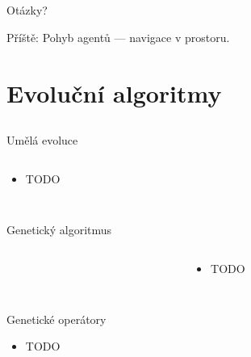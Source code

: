 \documentclass{beamer}
\begin{document}
\subsection{}
\begin{frame}{Otázky?}
\begin{center}
Příště: Pohyb agentů --- navigace v prostoru.
\end{center}
\end{frame}

\section{Evoluční algoritmy}

\subsection{}
\begin{frame}{Umělá evoluce}
\begin{columns}
\begin{column}{6cm}
\begin{itemize}
\item TODO
\end{itemize}
\end{column}
\begin{column}{5cm}
\end{column}
\end{columns}
\end{frame}

\subsection{}
\begin{frame}{Genetický algoritmus}
\begin{columns}
\begin{column}{5cm}
\end{column}
\begin{column}{6cm}
\begin{itemize}
\item TODO
\end{itemize}
\end{column}
\end{columns}
\end{frame}

\subsection{}
\begin{frame}{Genetické operátory}
\begin{itemize}
\item TODO
\end{itemize}
\end{frame}
\end{document}
